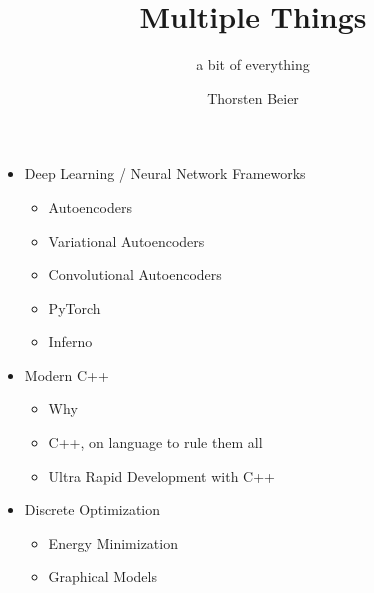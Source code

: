 \documentclass{beamer}
\title{Multiple Things}
\subtitle{a bit of everything}
\author{Thorsten Beier}
\begin{document}
\begin{frame}[label=current]
\titlepage
\end{frame}

\begin{frame}
  \begin{itemize}
        \item<+->Deep Learning / Neural Network Frameworks
        \begin{itemize}
            \item<+-> Autoencoders
            \item<+-> Variational Autoencoders
            \item<+-> Convolutional Autoencoders
            \item<+-> PyTorch
            \item<+-> Inferno
        \end{itemize}
        \item<+->Modern C++
        \begin{itemize}
            \item<+-> Why
            \item<+-> C++, on language to rule them all
            \item<+-> Ultra Rapid Development with C++
        \end{itemize}     
        \item<+-> Discrete Optimization
        \begin{itemize}
            \item<+-> Energy Minimization
            \item<+-> Graphical Models
        \end{itemize}        
  \end{itemize}
\end{frame}




\newcommand{\source}[1]{\begin{textblock*}{12cm}(0.0cm, 8.0cm)
    \begin{beamercolorbox}[ht=0.5cm,right]{framesource}
        \usebeamerfont{framesource}\usebeamercolor[fg]{framesource} Source: {#1}
    \end{beamercolorbox}
\end{textblock*}}


\newcommand{\imgsource}[1]{\begin{textblock*}{12cm}(0.0cm, 8.0cm)
    \begin{beamercolorbox}[ht=0.5cm,right]{framesource}
        \usebeamerfont{framesource}\usebeamercolor[fg]{framesource} Image Source: {#1}
    \end{beamercolorbox}
\end{textblock*}}
\end{document}
